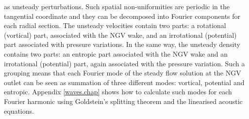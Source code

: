  as unsteady perturbations.
 Such spatial non-uniformities are periodic in the tangential coordinate
 and they can be decomposed into Fourier components for each radial section.
 The unsteady velocities contain two parts: a rotational (vortical) part, associated
 with the NGV wake, and an irrotational (potential) part associated with pressure
 variations. In the same way, the unsteady density contains two parts: an entropic
 part associated with the NGV wake and an irrotational (potential) part, again
 associated with the pressure variation.
 Such a grouping means that each Fourier mode of the steady flow solution at the
 NGV outlet can be seen as summation of three different modes:
 vortical, potential and entropic.
 Appendix \ref{waves.chap} shows how to calculate
 such modes for each Fourier harmonic using Goldstein's splitting theorem
 and the linearised acoustic equations.

